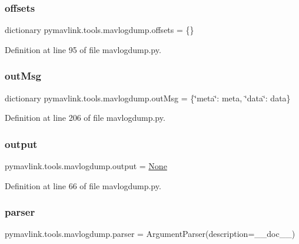 \subsubsection{\texorpdfstring{offsets}{offsets}}
{\footnotesize\ttfamily dictionary pymavlink.\+tools.\+mavlogdump.\+offsets = \{\}}



Definition at line 95 of file mavlogdump.\+py.

\mbox{\label{namespacepymavlink_1_1tools_1_1mavlogdump_a4702d8d4cc541614f5245654255814b7}} 
\subsubsection{\texorpdfstring{outMsg}{outMsg}}
{\footnotesize\ttfamily dictionary pymavlink.\+tools.\+mavlogdump.\+out\+Msg = \{\char`\"{}meta\char`\"{}\+: meta, \char`\"{}data\char`\"{}\+: data\}}



Definition at line 206 of file mavlogdump.\+py.

\mbox{\label{namespacepymavlink_1_1tools_1_1mavlogdump_ac1b6c1536c0aa1b9e72138b338e2875d}} 
\subsubsection{\texorpdfstring{output}{output}}
{\footnotesize\ttfamily pymavlink.\+tools.\+mavlogdump.\+output = \mbox{\hyperlink{namespacepymavlink_1_1tools_1_1mavlogdump_a4f907ac5c5d06d13d8020f0969229a7e}{None}}}



Definition at line 66 of file mavlogdump.\+py.

\mbox{\label{namespacepymavlink_1_1tools_1_1mavlogdump_a5944af650a62ea2df82b07337e46c14a}} 
\subsubsection{\texorpdfstring{parser}{parser}}
{\footnotesize\ttfamily pymavlink.\+tools.\+mavlogdump.\+parser = Argument\+Parser(description=\+\_\+\+\_\+doc\+\_\+\+\_\+)}



